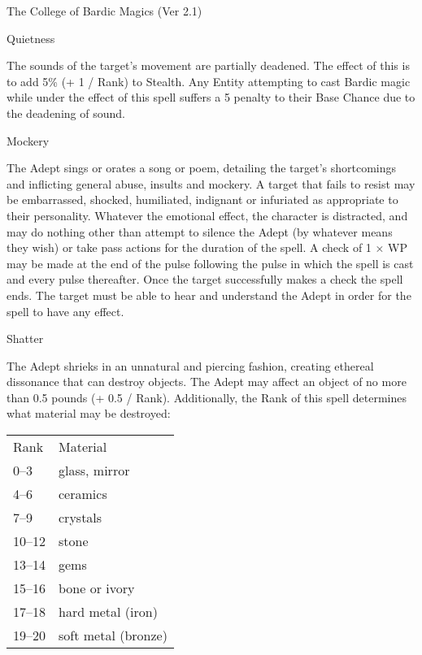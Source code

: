 \begin{Chapter}{The College of Bardic Magics (Ver 2.1)}
\begin{spell}[G-5]{Quietness}

\begin{effects}
The sounds of the target’s movement are partially deadened. The effect
of this is to add 5\% (+ 1 / Rank) to Stealth.  Any Entity attempting
to cast Bardic magic while under the effect of this spell suffers a 5
penalty to their Base Chance due to the deadening of sound.
\end{effects}
\end{spell}

\begin{spell}[G-6]{Mockery}

\begin{effects}
The Adept sings or orates a song or poem, detailing the target’s
shortcomings and inflicting general abuse, insults and mockery.  A
target that fails to resist may be embarrassed, shocked, humiliated,
indignant or infuriated as appropriate to their personality.  Whatever
the emotional effect, the character is distracted, and may do nothing
other than attempt to silence the Adept (by whatever means they wish)
or take pass actions for the duration of the spell.  A check of 1 × WP
may be made at the end of the pulse following the pulse in which the
spell is cast and every pulse thereafter.  Once the target
successfully makes a check the spell ends.  The target must be able to
hear and understand the Adept in order for the spell to have any
effect.
\end{effects}
\end{spell}

\begin{spell}[G-7]{Shatter}

\begin{effects}
The Adept shrieks in an unnatural and piercing fashion, creating
ethereal dissonance that can destroy objects.  The Adept may affect an
object of no more than 0.5 pounds (+ 0.5 / Rank).  Additionally, the
Rank of this spell determines what material may be destroyed:
\begin{tabularx}{\columnwidth}{Xl}
Rank	& Material \\
0--3	& glass, mirror \\
4--6	& ceramics \\
7--9	& crystals \\
10--12	& stone \\
13--14	& gems \\
15--16	& bone or ivory \\
17--18  & hard metal (iron) \\
19--20  & soft metal (bronze) \\
\end{tabularx}


\end{effects}
\end{spell}
\end{Chapter}
